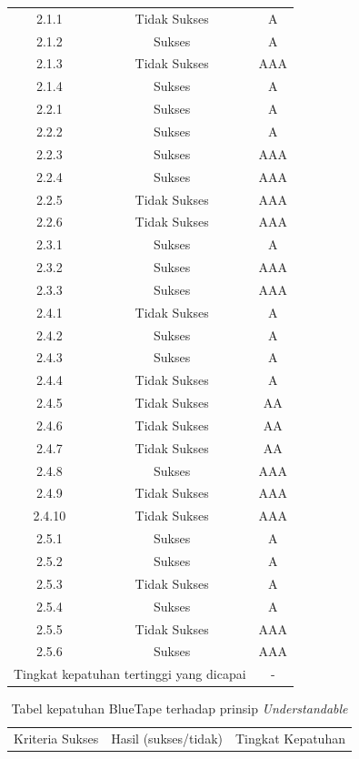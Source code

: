 \documentclass[a4paper,twoside]{article}
\begin{document}
\begin{enumerate}
\begin{table}[H]
\begin{tabular}{|c|c|c|}
				\midrule
				2.1.1 & Tidak Sukses & A \\
				2.1.2 & Sukses & A \\
				2.1.3 & Tidak Sukses & AAA \\
				2.1.4 & Sukses & A \\
				2.2.1 & Sukses & A \\
				2.2.2 & Sukses & A \\
				2.2.3 & Sukses & AAA \\
				2.2.4 & Sukses & AAA \\
				2.2.5 & Tidak Sukses & AAA \\
				2.2.6 & Tidak Sukses & AAA \\
				2.3.1 & Sukses & A \\
				2.3.2 & Sukses & AAA \\
				2.3.3 & Sukses & AAA \\
				2.4.1 & Tidak Sukses & A \\
				2.4.2 & Sukses & A \\
				2.4.3 & Sukses & A \\
				2.4.4 & Tidak Sukses & A \\
				2.4.5 & Tidak Sukses & AA \\
				2.4.6 & Tidak Sukses & AA \\
				2.4.7 & Tidak Sukses & AA \\
				2.4.8 & Sukses & AAA \\
				2.4.9 & Tidak Sukses & AAA \\
				2.4.10 & Tidak Sukses & AAA \\
				2.5.1 & Sukses & A \\
				2.5.2 & Sukses & A \\
				2.5.3 & Tidak Sukses & A \\
				2.5.4 & Sukses & A \\
				2.5.5 & Tidak Sukses & AAA \\
				2.5.6 & Sukses & AAA \\

				\bottomrule
				\multicolumn{2}{|c|}{Tingkat kepatuhan tertinggi yang dicapai} & - \\
				\bottomrule

			\end{tabular}
		\end{table}

		\begin{table}[H]
			\centering 
			\caption{Tabel kepatuhan BlueTape terhadap prinsip \textit{Understandable}}
			\label{tab:kepatuhan_bluetape_understandable}
			\begin{tabular}{|c|c|c|}
				\toprule
				Kriteria Sukses & Hasil (sukses/tidak) & Tingkat Kepatuhan \\


\end{tabular}
\end{table}
\end{enumerate}
\end{document}
